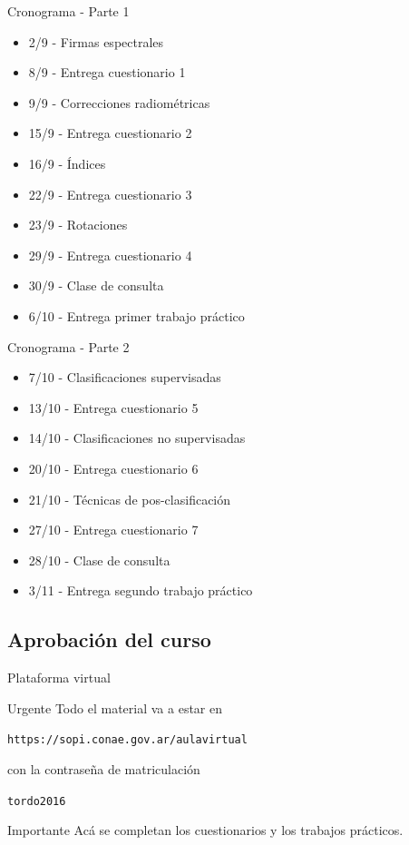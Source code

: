 \documentclass[handout]{beamer}
\begin{document}
\begin{frame}{Cronograma - Parte 1}
    \begin{itemize}[<+->]
    \item 2/9 - Firmas espectrales
    \item 8/9 - Entrega cuestionario 1
    \item 9/9 - Correcciones radiométricas
    \item 15/9 - Entrega cuestionario 2
    \item 16/9 - Índices
    \item 22/9 - Entrega cuestionario 3
    \item 23/9 - Rotaciones
    \item 29/9 - Entrega cuestionario 4
    \item 30/9 - Clase de consulta
    \item 6/10 - Entrega primer trabajo práctico
  \end{itemize}
\end{frame}
\begin{frame}{Cronograma - Parte 2}
    \begin{itemize}[<+->]
    \item 7/10 - Clasificaciones supervisadas
    \item 13/10 - Entrega cuestionario 5
    \item 14/10 - Clasificaciones no supervisadas
    \item 20/10 - Entrega cuestionario 6
    \item 21/10 - Técnicas de pos-clasificación
    \item 27/10 - Entrega cuestionario 7
    \item 28/10 - Clase de consulta
    \item 3/11 - Entrega segundo trabajo práctico
  \end{itemize}
\end{frame}

\subsection{Aprobación del curso}
\begin{frame}{Plataforma virtual}
  \begin{block}{Urgente}
    Todo el material va a estar en
    \begin{center}
      \texttt{https://sopi.conae.gov.ar/aulavirtual}\pause
    \end{center}
    con la contraseña de matriculación
    \begin{center}
      \texttt{tordo2016}
    \end{center}
  \end{block}\pause
  \begin{alertblock}{Importante}
    Acá se completan los cuestionarios y los trabajos prácticos.
  \end{alertblock}
\end{frame}
\end{document}
